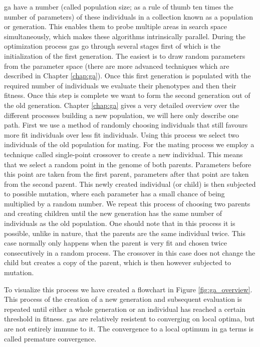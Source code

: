 \gls{ga} have a number (called population size; as a rule of thumb ten times the number of parameters) of these \glspl{individual} in a collection known as a population or generation. This enables them to probe multiple areas in search space simultaneously, which makes these algorithms intrinsically parallel. During the optimization process \glspl{ga} go through several stages first of which is the initialization of the first generation. The easiest is to draw random parameters from the parameter space (there are more advanced techniques which are described in Chapter \ref{chap:ga}). Once this first generation is populated with the required number of \glspl{individual} we evaluate their \glspl{phenotype} and then their \gls{fitness}. Once this step is complete we want to form the second generation out of the old generation. Chapter \ref{chap:ga} gives a very detailed overview over the different processes building a new population, we will here only describe one path. First we use a method of randomly choosing individuals that still favours more fit \glspl{individual} over less fit \glspl{individual}. Using this process we select two \glspl{individual} of the old population for mating. For the mating process we employ a technique called single-point \gls{crossover} to create a new individual. This means that we select a random point in the \gls{genome} of both parents. Parameters before this point are taken from the first parent, parameters after that point are taken from the second parent. This newly created \gls{individual} (or \gls{child}) is then subjected to possible mutation, where each parameter has a small chance of being multiplied by a random number. We repeat this process of choosing two parents and creating children until the new generation has the same number of individuals as the old population. One should note that in this process it is possible, unlike in nature, that the parents are the same individual twice. This case normally only happens when the parent is very fit and chosen twice consecutively in a random process. The \gls{crossover} in this case does not change the child but creates a copy of the parent, which is then however subjected to mutation. 


To visualize this process we have created a flowchart in Figure \ref{fig:ga_overview}. This process of the creation of a new generation and subsequent evaluation is repeated until either a whole generation or an \gls{individual} has reached a certain threshold in \gls{fitness}. \glspl{ga} are relatively resistent to converging on local optima, but are not entirely immune to it. The convergence to a local optimum in \gls{ga} terms is called premature convergence. 

